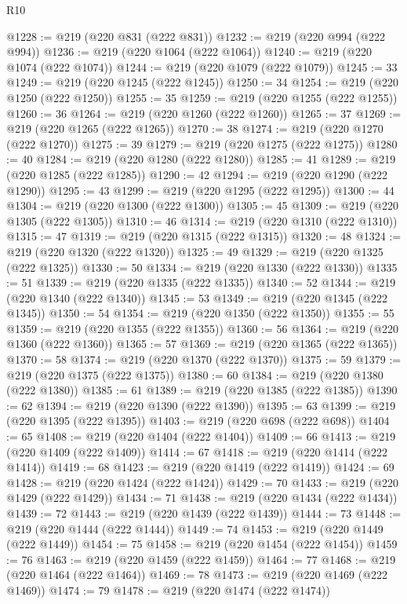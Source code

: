 \begin{lexlean}{R10}
\begin{coremodule}
@1228 := @219 (@220 @831 (@222 @831))
@1232 := @219 (@220 @994 (@222 @994))
@1236 := @219 (@220 @1064 (@222 @1064))
@1240 := @219 (@220 @1074 (@222 @1074))
@1244 := @219 (@220 @1079 (@222 @1079))
@1245 := 33
@1249 := @219 (@220 @1245 (@222 @1245))
@1250 := 34
@1254 := @219 (@220 @1250 (@222 @1250))
@1255 := 35
@1259 := @219 (@220 @1255 (@222 @1255))
@1260 := 36
@1264 := @219 (@220 @1260 (@222 @1260))
@1265 := 37
@1269 := @219 (@220 @1265 (@222 @1265))
@1270 := 38
@1274 := @219 (@220 @1270 (@222 @1270))
@1275 := 39
@1279 := @219 (@220 @1275 (@222 @1275))
@1280 := 40
@1284 := @219 (@220 @1280 (@222 @1280))
@1285 := 41
@1289 := @219 (@220 @1285 (@222 @1285))
@1290 := 42
@1294 := @219 (@220 @1290 (@222 @1290))
@1295 := 43
@1299 := @219 (@220 @1295 (@222 @1295))
@1300 := 44
@1304 := @219 (@220 @1300 (@222 @1300))
@1305 := 45
@1309 := @219 (@220 @1305 (@222 @1305))
@1310 := 46
@1314 := @219 (@220 @1310 (@222 @1310))
@1315 := 47
@1319 := @219 (@220 @1315 (@222 @1315))
@1320 := 48
@1324 := @219 (@220 @1320 (@222 @1320))
@1325 := 49
@1329 := @219 (@220 @1325 (@222 @1325))
@1330 := 50
@1334 := @219 (@220 @1330 (@222 @1330))
@1335 := 51
@1339 := @219 (@220 @1335 (@222 @1335))
@1340 := 52
@1344 := @219 (@220 @1340 (@222 @1340))
@1345 := 53
@1349 := @219 (@220 @1345 (@222 @1345))
@1350 := 54
@1354 := @219 (@220 @1350 (@222 @1350))
@1355 := 55
@1359 := @219 (@220 @1355 (@222 @1355))
@1360 := 56
@1364 := @219 (@220 @1360 (@222 @1360))
@1365 := 57
@1369 := @219 (@220 @1365 (@222 @1365))
@1370 := 58
@1374 := @219 (@220 @1370 (@222 @1370))
@1375 := 59
@1379 := @219 (@220 @1375 (@222 @1375))
@1380 := 60
@1384 := @219 (@220 @1380 (@222 @1380))
@1385 := 61
@1389 := @219 (@220 @1385 (@222 @1385))
@1390 := 62
@1394 := @219 (@220 @1390 (@222 @1390))
@1395 := 63
@1399 := @219 (@220 @1395 (@222 @1395))
@1403 := @219 (@220 @698 (@222 @698))
@1404 := 65
@1408 := @219 (@220 @1404 (@222 @1404))
@1409 := 66
@1413 := @219 (@220 @1409 (@222 @1409))
@1414 := 67
@1418 := @219 (@220 @1414 (@222 @1414))
@1419 := 68
@1423 := @219 (@220 @1419 (@222 @1419))
@1424 := 69
@1428 := @219 (@220 @1424 (@222 @1424))
@1429 := 70
@1433 := @219 (@220 @1429 (@222 @1429))
@1434 := 71
@1438 := @219 (@220 @1434 (@222 @1434))
@1439 := 72
@1443 := @219 (@220 @1439 (@222 @1439))
@1444 := 73
@1448 := @219 (@220 @1444 (@222 @1444))
@1449 := 74
@1453 := @219 (@220 @1449 (@222 @1449))
@1454 := 75
@1458 := @219 (@220 @1454 (@222 @1454))
@1459 := 76
@1463 := @219 (@220 @1459 (@222 @1459))
@1464 := 77
@1468 := @219 (@220 @1464 (@222 @1464))
@1469 := 78
@1473 := @219 (@220 @1469 (@222 @1469))
@1474 := 79
@1478 := @219 (@220 @1474 (@222 @1474))

\end{coremodule}
\end{lexlean}
